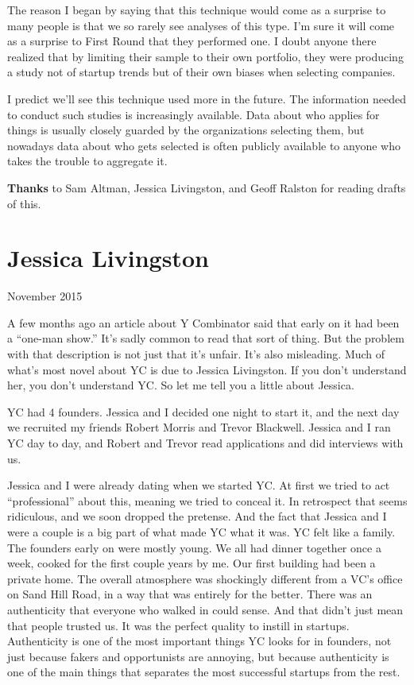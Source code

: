 \documentclass[12pt]{book}
\begin{document}
The reason I began by saying that this technique would come as a
surprise to many people is that we so rarely see analyses of this type.
I'm sure it will come as a surprise to First Round that they performed
one. I doubt anyone there realized that by limiting their sample to
their own portfolio, they were producing a study not of startup trends
but of their own biases when selecting companies.

I predict we'll see this technique used more in the future. The
information needed to conduct such studies is increasingly available.
Data about who applies for things is usually closely guarded by the
organizations selecting them, but nowadays data about who gets selected
is often publicly available to anyone who takes the trouble to aggregate
it.


\textbf{Thanks} to Sam Altman, Jessica Livingston, and Geoff Ralston for
reading drafts of this.
\chapter{Jessica Livingston}

November 2015

A few months ago an article about Y Combinator said that early on it had
been a ``one-man show.'' It's sadly common to read that sort of thing.
But the problem with that description is not just that it's unfair. It's
also misleading. Much of what's most novel about YC is due to Jessica
Livingston. If you don't understand her, you don't understand YC. So let
me tell you a little about Jessica.

YC had 4 founders. Jessica and I decided one night to start it, and the
next day we recruited my friends Robert Morris and Trevor Blackwell.
Jessica and I ran YC day to day, and Robert and Trevor read applications
and did interviews with us.

Jessica and I were already dating when we started YC. At first we tried
to act ``professional'' about this, meaning we tried to conceal it. In
retrospect that seems ridiculous, and we soon dropped the pretense. And
the fact that Jessica and I were a couple is a big part of what made YC
what it was. YC felt like a family. The founders early on were mostly
young. We all had dinner together once a week, cooked for the first
couple years by me. Our first building had been a private home. The
overall atmosphere was shockingly different from a VC's office on Sand
Hill Road, in a way that was entirely for the better. There was an
authenticity that everyone who walked in could sense. And that didn't
just mean that people trusted us. It was the perfect quality to instill
in startups. Authenticity is one of the most important things YC looks
for in founders, not just because fakers and opportunists are annoying,
but because authenticity is one of the main things that separates the
most successful startups from the rest.
\end{document}
